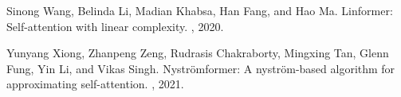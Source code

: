 \documentclass{ieeeaccess}
\begin{document}
\begin{thebibliography}{10}
Sinong Wang, Belinda Li, Madian Khabsa, Han Fang, and Hao Ma.
\newblock Linformer: Self-attention with linear complexity.
, 2020.

Yunyang Xiong, Zhanpeng Zeng, Rudrasis Chakraborty, Mingxing Tan, Glenn Fung,
  Yin Li, and Vikas Singh.
\newblock Nystr\"omformer: A nystr\"om-based algorithm for approximating
  self-attention.
, 2021.

\end{thebibliography}





\EOD
\end{document}
